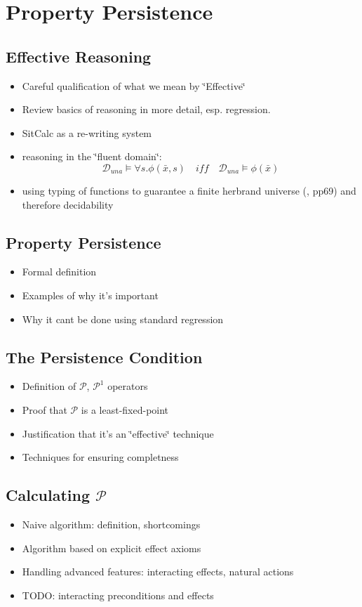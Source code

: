 
\chapter{Property Persistence}

\label{ch:persistence} %



\section{Effective Reasoning}

\begin{itemize}
\item Careful qualification of what we mean by \char`\"{}Effective\char`\"{} 
\item Review basics of reasoning in more detail, esp. regression. 
\item SitCalc as a re-writing system 
\item reasoning in the \char`\"{}fluent domain\char`\"{}: \[
\mathcal{D}_{una}\models\forall s.\phi(\bar{x},s)\,\,\,\,\,\, iff\,\,\,\,\,\,\mathcal{D}_{una}\models\phi(\bar{x})\]

\item using typing of functions to guarantee a finite herbrand universe
(\cite{levesque04krr_book}, pp69) and therefore decidability 
\end{itemize}

\section{Property Persistence}

\begin{itemize}
\item Formal definition 
\item Examples of why it's important 
\item Why it cant be done using standard regression 
\end{itemize}

\section{The Persistence Condition}

\begin{itemize}
\item Definition of $\mathcal{P}$, $\mathcal{P}^{1}$ operators 
\item Proof that $\mathcal{P}$ is a least-fixed-point 
\item Justification that it's an \char`\"{}effective\char`\"{} technique 
\item Techniques for ensuring completness 
\end{itemize}

\section{Calculating $\mathcal{P}$}

\begin{itemize}
\item Naive algorithm: definition, shortcomings 
\item Algorithm based on explicit effect axioms 
\item Handling advanced features: interacting effects, natural actions 
\item TODO: interacting preconditions and effects 
\end{itemize}

